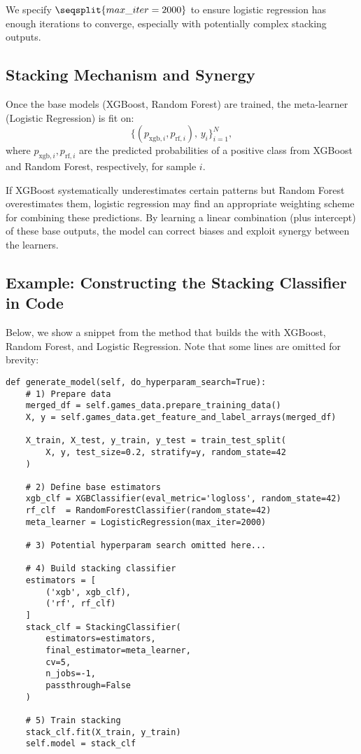 \documentclass[12pt]{article}
\begin{document}
\noindent We specify \(\seqsplit{max\_iter=2000}\) to ensure logistic regression has enough iterations to converge, especially with potentially complex stacking outputs.

\subsection{Stacking Mechanism and Synergy}
Once the base models (XGBoost, Random Forest) are trained, the meta-learner (Logistic Regression) is fit on:
\[
\big\{ (p_{\text{xgb},i}, p_{\text{rf},i}),\, y_i \big\}_{i=1}^N,
\]
where \(p_{\text{xgb},i}, p_{\text{rf},i}\) are the predicted probabilities of a positive class from XGBoost and Random Forest, respectively, for sample \(i\).

If XGBoost systematically underestimates certain patterns but Random Forest overestimates them, logistic regression may find an appropriate weighting scheme for combining these predictions. By learning a linear combination (plus intercept) of these base outputs, the model can correct biases and exploit synergy between the learners.

\subsection{Example: Constructing the Stacking Classifier in Code}
Below, we show a snippet from the  method that builds the  with XGBoost, Random Forest, and Logistic Regression. Note that some lines are omitted for brevity:

\begin{verbatim}
def generate_model(self, do_hyperparam_search=True):
    # 1) Prepare data
    merged_df = self.games_data.prepare_training_data()
    X, y = self.games_data.get_feature_and_label_arrays(merged_df)

    X_train, X_test, y_train, y_test = train_test_split(
        X, y, test_size=0.2, stratify=y, random_state=42
    )

    # 2) Define base estimators
    xgb_clf = XGBClassifier(eval_metric='logloss', random_state=42)
    rf_clf  = RandomForestClassifier(random_state=42)
    meta_learner = LogisticRegression(max_iter=2000)

    # 3) Potential hyperparam search omitted here...
    
    # 4) Build stacking classifier
    estimators = [
        ('xgb', xgb_clf),
        ('rf', rf_clf)
    ]
    stack_clf = StackingClassifier(
        estimators=estimators,
        final_estimator=meta_learner,
        cv=5,
        n_jobs=-1,
        passthrough=False
    )

    # 5) Train stacking
    stack_clf.fit(X_train, y_train)
    self.model = stack_clf
\end{verbatim}
\end{document}
